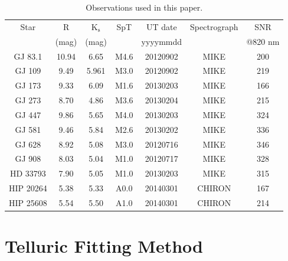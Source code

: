 \begin{table}
  \centering
  \caption{Observations used in this paper. }
  \begin{tabular}{|ccccccc|}
  \hline
    Star &    R   &  $\mathrm{K_s}$ & SpT  & UT date  & Spectrograph & SNR    \\
         &  (mag) & (mag)      &      & yyyymmdd &              & @820 nm \\ 
    \hline \hline
    
    GJ 83.1  &  10.94  &  6.65  &  M4.6  &  20120902  &  MIKE  &  200  \\
    GJ 109 &  9.49  &   5.961   & M3.0 & 20120902 & MIKE        & 219 \\
    GJ 173  &  9.33  &  6.09  &  M1.6  &  20130203  &  MIKE  &  166 \\
    GJ 273  &  8.70  &  4.86  &  M3.6  &  20130204  &  MIKE  &  215\\
    GJ 447  &  9.86  &  5.65  &  M4.0  &  20130203  &  MIKE  &  324 \\
    GJ 581  &  9.46  &  5.84  &  M2.6  &  20130202  &  MIKE  &  336 \\
    GJ 628 &  8.92  &  5.08  &  M3.0  &  20120716  &  MIKE  &  346 \\
    GJ 908  &  8.03  &  5.04  &  M1.0  &  20120717  &  MIKE  &  328 \\
    HD 33793  &  7.90  &  5.05  &  M1.0  & 20130203  &  MIKE  &  315 \\
    HIP 20264  &  5.38  &  5.33 &  A0.0  &  20140301  &  CHIRON  &  167 \\
    HIP 25608  &  5.54  &  5.50  &  A1.0  &  20140301  & CHIRON  &  214 \\
    \hline
  
  \end{tabular}
  \label{paper3_tab:sample}

\end{table}



\section{Telluric Fitting Method}
\label{paper3_sec:tellcorr}

